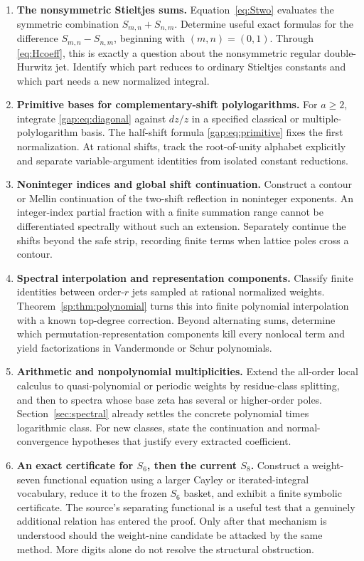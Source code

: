 \begin{enumerate}[leftmargin=*,label=\textbf{Q\arabic*.},itemsep=8pt]
\item \textbf{The nonsymmetric Stieltjes sums.}
Equation~\eqref{eq:Stwo} evaluates the symmetric combination
$S_{m,n}+S_{n,m}$. Determine useful exact formulas for the difference
$S_{m,n}-S_{n,m}$, beginning with $(m,n)=(0,1)$. Through
\eqref{eq:Hcoeff}, this is exactly a question about the nonsymmetric
regular double-Hurwitz jet. Identify which part reduces to ordinary
Stieltjes constants and which part needs a new normalized integral.

\item \textbf{Primitive bases for complementary-shift polylogarithms.}
For $a\ge2$, integrate \eqref{gap:eq:diagonal} against $dz/z$ in a
specified classical or multiple-polylogarithm basis. The half-shift
formula \eqref{gap:eq:primitive} fixes the first normalization.
At rational shifts, track the root-of-unity alphabet explicitly and
separate variable-argument identities from isolated constant reductions.

\item \textbf{Noninteger indices and global shift continuation.}
Construct a contour or Mellin continuation of the two-shift reflection
in noninteger exponents. An integer-index partial fraction with a
finite summation range cannot be differentiated spectrally without
such an extension. Separately continue the shifts beyond the safe
strip, recording finite terms when lattice poles cross a contour.

\item \textbf{Spectral interpolation and representation components.}
Classify finite identities between order-$r$ jets sampled at rational
normalized weights. Theorem~\ref{sp:thm:polynomial} turns this into
finite polynomial interpolation with a known top-degree correction.
Beyond alternating sums, determine which permutation-representation
components kill every nonlocal term and yield factorizations in
Vandermonde or Schur polynomials.

\item \textbf{Arithmetic and nonpolynomial multiplicities.}
Extend the all-order local calculus to quasi-polynomial or periodic
weights by residue-class splitting, and then to spectra whose base
zeta has several or higher-order poles. Section~\ref{sec:spectral}
already settles the concrete polynomial times logarithmic class.
For new classes, state the continuation and normal-convergence
hypotheses that justify every extracted coefficient.

\item \textbf{An exact certificate for $S_6$, then the current $S_8$.}
Construct a weight-seven functional equation using a larger Cayley or
iterated-integral vocabulary, reduce it to the frozen $S_6$ basket,
and exhibit a finite symbolic certificate. The source's separating
functional is a useful test that a genuinely additional relation has
entered the proof. Only after that mechanism is understood should
the weight-nine candidate be attacked by the same method. More
digits alone do not resolve the structural obstruction.


\end{enumerate}
